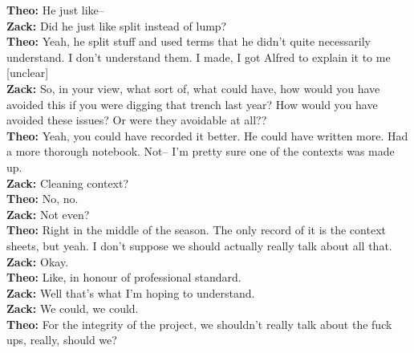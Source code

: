 \documentclass[
]{article}
\begin{document}
\textbf{Theo:} He just like--\\
\textbf{Zack:} Did he just like split instead of lump?\\
\textbf{Theo:} Yeah, he split stuff and used terms that he didn't quite
necessarily understand. I don't understand them. I made, I got Alfred to
explain it to me {[}unclear{]}\\
\textbf{Zack:} So, in your view, what sort of, what could have, how
would you have avoided this if you were digging that trench last year?
How would you have avoided these issues? Or were they avoidable at
all??\\
\textbf{Theo:} Yeah, you could have recorded it better. He could have
written more. Had a more thorough notebook. Not-- I'm pretty sure one of
the contexts was made up.\\
\textbf{Zack:} Cleaning context?\\
\textbf{Theo:} No, no.\\
\textbf{Zack:} Not even?\\
\textbf{Theo:} Right in the middle of the season. The only record of it
is the context sheets, but yeah. I don't suppose we should actually
really talk about all that.\\
\textbf{Zack:} Okay.\\
\textbf{Theo:} Like, in honour of professional standard.\\
\textbf{Zack:} Well that's what I'm hoping to understand.\\
\textbf{Zack:} We could, we could.\\
\textbf{Theo:} For the integrity of the project, we shouldn't really
talk about the fuck ups, really, should we?

\printbibliography
\end{document}

